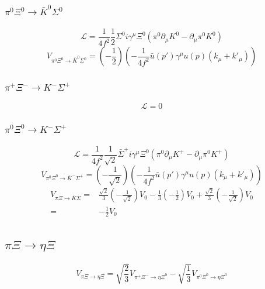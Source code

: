 \subsubsection{$\pi^{0}\Xi^{0}\to \bar{K}^{0}\Sigma^{0}$}
\begin{equation}
	\mathcal{L}=\frac{1}{4f^2}\frac{1}{2}\Sigma^{0}i\gamma^{\mu}\Xi^{0}(\pi^{0}\partial_{\mu}K^{0}-\partial_{\mu}\pi^{0}K^{0})
\end{equation}
\begin{equation}
	V_{\pi^{0}\Xi^{0}\rightarrow \bar{K}^{0}\Sigma^{0}}=\left(-\frac{1}{2}\right)\left(-\frac{1}{4f^2}\bar{u}(p')\gamma^{\mu}u(p)(k_{\mu}+k'_{\mu})\right)
\end{equation}
\subsubsection{$\pi^{+}\Xi^{-}\rightarrow K^{-}\Sigma^{+}$}
\begin{equation}
	\mathcal{L}=0
\end{equation}
\subsubsection{$\pi^{0}\Xi^{0}\rightarrow K^{-}\Sigma^{+}$}
\begin{equation}
	\mathcal{L}=\frac{1}{4f^2}\frac{1}{\sqrt{2}}\bar{\Sigma}^{+}i\gamma^{\mu}\Xi^{0}(\pi^{0}\partial_{\mu}K^{+}-\partial_{\mu}\pi^{0}K^{+})
\end{equation}
\begin{equation}
	V_{\pi^{0}\Xi^{0}\rightarrow \bar{K}^{-}\Sigma^{+}}=\left(-\frac{1}{\sqrt{2}}\right)\left(-\frac{1}{4f^2}\bar{u}(p')\gamma^{\mu}u(p)(k_{\mu}+k'_{\mu})\right)
\end{equation}
\begin{equation}
\begin{split}
	V_{\pi\Xi\rightarrow \bar{K}\Sigma}=&\frac{\sqrt{2}}{3}(-\frac{1}{\sqrt{2}})V_{0}-\frac{1}{3}(-\frac{1}{2})V_{0}+\frac{\sqrt{2}}{3}(-\frac{1}{\sqrt{2}})V_{0}\\
	=&-\frac{1}{2}V_{0}
\end{split}
\end{equation}
\subsection{$\pi\Xi\rightarrow\eta\Xi$}
\begin{equation}
	V_{\pi\Xi\rightarrow\eta\Xi}=\sqrt{\frac{2}{3}}V_{\pi^{+}\Xi^{-}\rightarrow\eta\Xi^{0}}-\sqrt{\frac{1}{3}}V_{\pi^{0}\Xi^{0}\rightarrow\eta\Xi^{0}}
\end{equation}
